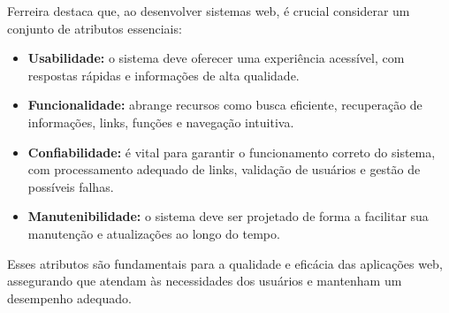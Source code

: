 Ferreira \cite{ferreira2023} destaca que, ao desenvolver sistemas web, é crucial considerar um conjunto de atributos essenciais:

\begin{itemize}
    \item \textbf{Usabilidade:} o sistema deve oferecer uma experiência acessível, com respostas rápidas e informações de alta qualidade.
    \item \textbf{Funcionalidade:} abrange recursos como busca eficiente, recuperação de informações, links, funções e navegação intuitiva.
    \item \textbf{Confiabilidade:} é vital para garantir o funcionamento correto do sistema, com processamento adequado de links, validação de usuários e gestão de possíveis falhas.
    \item \textbf{Manutenibilidade:} o sistema deve ser projetado de forma a facilitar sua manutenção e atualizações ao longo do tempo.
\end{itemize}

Esses atributos são fundamentais para a qualidade e eficácia das aplicações web, assegurando que atendam às necessidades dos usuários e mantenham um desempenho adequado.


